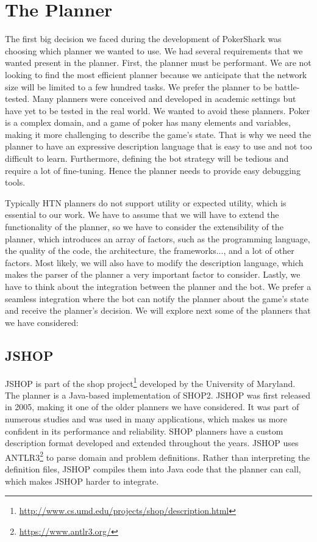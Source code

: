 
\section{The Planner}

The first big decision we faced during the development of PokerShark was choosing which planner we wanted to use. We had several requirements that we wanted present in the planner. First, the planner must be performant. We are not looking to find the most efficient planner because we anticipate that the network size will be limited to a few hundred tasks. We prefer the planner to be battle-tested. Many planners were conceived and developed in academic settings but have yet to be tested in the real world. We wanted to avoid these planners. Poker is a complex domain, and a game of poker has many elements and variables, making it more challenging to describe the game's state. That is why we need the planner to have an expressive description language that is easy to use and not too difficult to learn. Furthermore, defining the bot strategy will be tedious and require a lot of fine-tuning. Hence the planner needs to provide easy debugging tools.

Typically HTN planners do not support utility or expected utility, which is essential to our work. We have to assume that we will have to extend the functionality of the planner, so we have to consider the extensibility of the planner, which introduces an array of factors, such as the programming language, the quality of the code, the architecture, the frameworks..., and a lot of other factors. Most likely, we will also have to modify the description language, which makes the parser of the planner a very important factor to consider. Lastly, we have to think about the integration between the planner and the bot. We prefer a seamless integration where the bot can notify the planner about the game's state and receive the planner's decision. We will explore next some of the planners that we have considered:



\subsection*{JSHOP}

JSHOP is part of the \gls{shop} project\footnote{\url{http://www.cs.umd.edu/projects/shop/description.html}} developed by the University of Maryland. The planner is a Java-based implementation of SHOP2. JSHOP was first released in 2005, making it one of the older planners we have considered. It was part of numerous studies and was used in many applications, which makes us more confident in its performance and reliability. SHOP planners have a custom description format developed and extended throughout the years. JSHOP uses ANTLR3\footnote{\url{https://www.antlr3.org/}} to parse domain and problem definitions. Rather than interpreting the definition files, JSHOP compiles them into Java code that the planner can call, which makes JSHOP harder to integrate.

